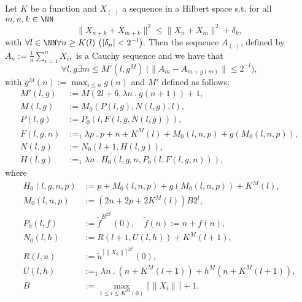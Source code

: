 \begin{thm} \label{t:fin}
Let $K$ be a function and $X_{(\cdot)}$ a sequence in a Hilbert space s.t. for all $m,n,k\in\NN$
\[
\|X_{n+k} + X_{m+k}\|^2 \leq \|X_{n} + X_{m}\|^2+\delta_k,
\]
with
$
\forall l\in\NN\forall n\geq K(l)\ \big( |\delta_{n}|<2^{-l}\big).
$
Then the sequence $A_{(\cdot)}$, defined by
$
A_n:=\frac{1}{n}\sum^n_{i=1}X_i,
$
is a Cauchy sequence and we have that
\[
\forall l,g \exists m\leq M'(l,g^M)\ \big( \|A_{m}-A_{m+g(m)}\|\leq 2^{-l} \big),
\]
with $g^M(n):=\max_{i\leq n} g(n)$ and $M'$ defined as follows:
\begin{align*}
M'(l,g)&:=M(2l+6, \lambda n\ .\ g(n+1))+1,\\
M(l,g)&:=M_0( P(l,g), N(l,g), l),\\
P(l,g)&:=P_0(l,F(l,g,N(l,g))),\\
F(l,g,n) &:=_1 \lambda p\ .\ p+n+K^M(l)+M_0(l,n,p)+g(M_0(l,n,p)),\\
N(l,g)&:=N_0(l+1,H(l,g)), \\
H(l,g)&:=_1 \lambda n\ .\  H_0(l,g,n,P_0(l,F(l,g,n))),
\end{align*}
where
\begin{align*}
 H_0(l,g,n,p)&:= p + M_0(l,n, p )+g(M_0(l,n, p ))+K^M(l),\\
 M_0(l,n,p)&:=(2n + 2p + 2K^M(l))B2^{l},\\
 P_0(l,f)&:=\tilde f^{B^22^l}(0),\quad \tilde f(n):=n + f(n),\\
 N_0(l,h)&:=R(l+1,U(l,h))+K^M(l+1), \\
 R(l,u)&:=\tilde u^{\lceil \|X_0\| \rceil^22^l}(0),\\
 U(l,h)&:=_1\lambda n\ .\ (n + K^M(l+1))+h^M(n + K^M(l+1)),\\
 B&:=\max_{1\leq i \leq K^M(0)} \lceil \|X_i\| \rceil+1.\\
\end{align*}

\end{thm}

